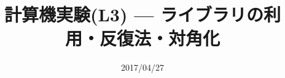 \documentclass[dvipdfmx]{beamer}
\title{計算機実験(L3) --- ライブラリの利用・反復法・対角化}
\date{2017/04/27}
\begin{document}
\begin{frame}
  \titlepage
  \tableofcontents
\end{frame}






\end{document}

